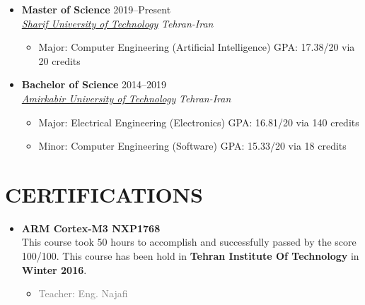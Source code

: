 \documentclass[10pt,a4paper,sans]{moderncv} %
\newcommand*{\authorimg}[1]{%
	\raisebox{-.3\baselineskip}{%
		\texttt{[image: \#1]}%
	}%
}
\begin{document}
\begin{itemize}
	
	\item \textbf{Master of Science} \hfill 2019--Present \\
	\href{http://www.sharif.ir}{\authorimg{pictures/sharif.png} \emph{Sharif University of Technology}} \hfill \emph{Tehran-Iran}
	
	\begin{itemize}
		\item Major: Computer Engineering (Artificial Intelligence) \hspace{7 pt}  
		GPA: 17.38/20 via 20 credits
	\end{itemize}
	
	
	\item \textbf{Bachelor of Science} \hfill 2014--2019 \\
	\href{http://aut.ac.ir/}{\authorimg{pictures/aut.png} \emph{Amirkabir University of Technology}} \hfill \emph{Tehran-Iran}

	\begin{itemize}
		\item Major: Electrical Engineering (Electronics) \hspace{51 pt}  GPA: 16.81/20 via 140 credits
		\item Minor: Computer Engineering (Software) \hspace{58 pt} GPA: 15.33/20 via 18 credits
	\end{itemize}
	

\end{itemize}

\section{CERTIFICATIONS}

\begin{itemize}

	\item \textbf{ARM Cortex-M3 NXP1768}\\
	This course took 50 hours to accomplish and successfully passed by the score 100/100. This course has been hold in \textbf{Tehran Institute Of Technology} in \textbf{Winter 2016}.
	
	\begin{itemize}
		\item \textcolor{gray}{Teacher: Eng. Najafi }
	\end{itemize}

\end{itemize}
\end{document}
